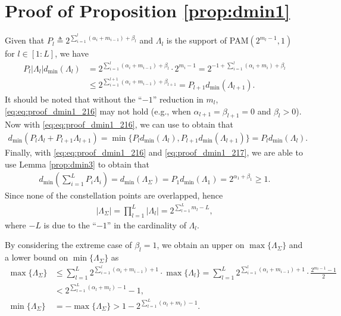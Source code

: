 \documentclass[12pt, draftclsnofoot, onecolumn]{IEEEtran}
\theoremstyle{definition}
\begin{document}
\section{Proof of Proposition \ref{prop:dmin1}}\label{proof:prop:dmin1}
Given that $P_l \triangleq 2^{\sum_{i=1}^l(\alpha_i+m_{i-1})+\beta_l}$ and $\Lambda_l$ is the support of PAM$(2^{m_l-1},1)$ for $l \in [1:L]$, we have
\begin{align}
P_l|\Lambda_l|d_{\min}(\Lambda_l) &= 2^{\sum_{i=1}^l(\alpha_i+m_{i-1})+\beta_l}\cdot 2^{m_i-1} %
= 2^{-1+\sum_{i=1}^l(\alpha_i+m_i)+\beta_l} \nonumber \\
& \leq 2^{\sum_{i=1}^{l+1}(\alpha_i+m_{i-1})+\beta_{l+1}} = P_{l+1}d_{\min}(\Lambda_{l+1}). \label{eq:eq:proof_dmin1_216}
\end{align}
It should be noted that without the ``$-1$'' reduction in $m_l$, \eqref{eq:eq:proof_dmin1_216} may not hold (e.g., when $\alpha_{l+1} = \beta_{l+1} = 0$ and $\beta_{l}>0$). Now with \eqref{eq:eq:proof_dmin1_216}, we can use \cite[Prop. 2]{7451210} to obtain that
\begin{align}\label{eq:proof_dmin1_217}
d_{\min}(P_l\Lambda_l+P_{l+1}\Lambda_{l+1}) =\min\{P_ld_{\min}(\Lambda_l),P_{l+1}d_{\min}(\Lambda_{l+1}) \}= P_l d_{\min}(\Lambda_l).
\end{align}
Finally, with \eqref{eq:eq:proof_dmin1_216} and \eqref{eq:proof_dmin1_217}, we are able to use Lemma \ref{prop:dmin3} to obtain that
\begin{align}
d_{\min}\left(\sum_{i=1}^{L}P_i\Lambda_i\right) = d_{\min}(\Lambda_{\Sigma})= P_1d_{\min}(\Lambda_1) =2^{\alpha_1+\beta_1} \geq 1.
\end{align}
Since none of the constellation points are overlapped, hence
\begin{align}
|\Lambda_{\Sigma}| = \prod\limits_{l=1}^L|\Lambda_l| = 2^{\sum_{l=1}^Lm_l-L},
\end{align}
where $-L$ is due to the ``$-1$'' in the cardinality of $\Lambda_l$.

By considering the extreme case of $\beta_l=1$, we obtain an upper on $\max\{\Lambda_{\Sigma}\}$ and a lower bound on $\min\{\Lambda_{\Sigma}\}$ as
\begin{align}
\max\{\Lambda_{\Sigma}\} &\leq \sum_{l=1}^L2^{\sum_{i=1}^l(\alpha_i+m_{i-1})+1}\cdot \max\{\Lambda_l\}   =\sum_{l=1}^L2^{\sum_{i=1}^l(\alpha_i+m_{i-1})+1}\cdot\frac{2^{m_l-1}-1}{2} \nonumber \\
&<2^{\sum_{l=1}^L(\alpha_l+m_l)-1}-1,  \label{eq:typeI_max} \\
\min\{\Lambda_{\Sigma}\} & = -\max\{\Lambda_{\Sigma}\}
>1-2^{\sum_{l=1}^L(\alpha_l+m_l)-1}.
\end{align}
\end{document}
